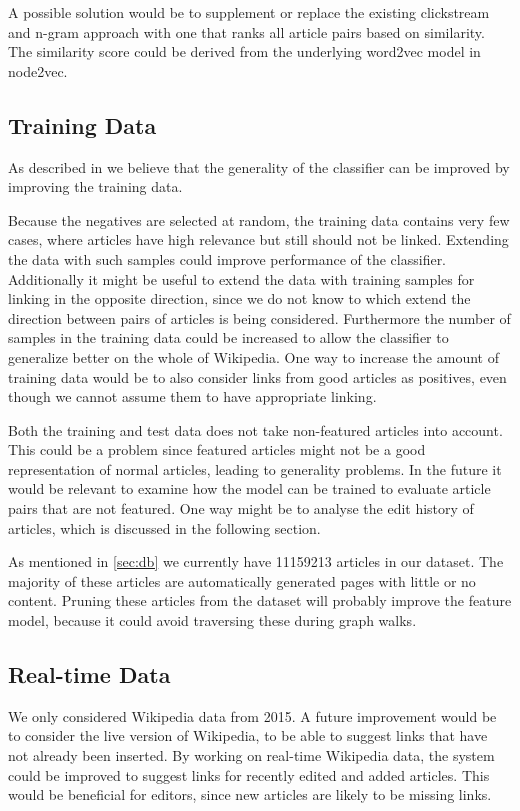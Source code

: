 A possible solution would be to supplement or replace the existing clickstream and n-gram approach with one that ranks all article pairs based on similarity. The similarity score could be derived from the underlying word2vec model in node2vec.

\subsection{Training Data}
As described in  we believe that the generality of the classifier can be improved by improving the training data.

Because the negatives are selected at random, the training data contains very few cases, where articles have high relevance but still should not be linked. Extending the data with such samples could improve performance of the classifier. Additionally it might be useful to extend the data with training samples for linking in the opposite direction, since we do not know to which extend the direction between pairs of articles is being considered. Furthermore the number of samples in the training data could be increased to allow the classifier to generalize better on the whole of Wikipedia. One way to increase the amount of training data would be to also consider links from good articles as positives, even though we cannot assume them to have appropriate linking.

Both the training and test data does not take non-featured articles into account. This could be a problem since featured articles might not be a good representation of normal articles, leading to generality problems. In the future it would be relevant to examine how the model can be trained to evaluate article pairs that are not featured. One way might be to analyse the edit history of articles, which is discussed in the following section. %

As mentioned in \cref{sec:db} we currently have \num{11159213} articles in our dataset. The majority of these articles are automatically generated pages with little or no content. Pruning these articles from the dataset will probably improve the feature model, because it could avoid traversing these during graph walks.

\subsection{Real-time Data}
We only considered Wikipedia data from 2015. A future improvement would be to consider the live version of Wikipedia, to be able to suggest links that have not already been inserted.
By working on real-time Wikipedia data, the system could be improved to suggest links for recently edited and added articles. This would be beneficial for editors, since new articles are likely to be missing links.

